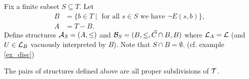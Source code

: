 \begin{Definition}
  Fix  a finite subset $S \subseteq T$. Let
  \begin{align*}
    B &= \{b \in T \mid \text{ for all $s \in S$ we have } \neg E(s, b)\}, \\
    A &= T - B.
  \end{align*}
  Define structures $\mathcal A_{S} = (A, \leq)$ and $\mathcal B_{S} = (B, \leq, \vec C\cap B, B)$ where $\mathcal L_A = \mathcal L$ (and $U \in \mathcal L_B$ vacuously interpreted by $B$). Note that $S \cap B = \emptyset$. (cf. example \ref{ex_disc})
\end{Definition}

\begin{Lemma} \label{subdivide}
  The pairs of structures defined above are all proper subdivisions of $\operatorname{\mathcal T}$.
\end{Lemma}

